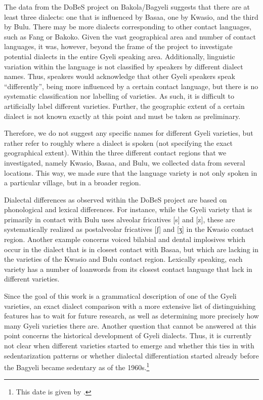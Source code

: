 The data from the DoBeS project on Bakola/Bagyeli suggests that there are at least three dialects: one that is influenced by Basaa, one by Kwasio, and the third by Bulu. There may be more dialects corresponding to other contact languages, such as Fang or Bakoko. Given the vast geographical area and number of contact languages, it was, however, beyond the frame of the project to investigate potential dialects in the entire Gyeli speaking area. Additionally, linguistic variation within the language is not classified by speakers by different dialect names. Thus, speakers would acknowledge that other Gyeli speakers speak ``differently'', being more influenced by a certain contact language, but there is no systematic classification nor labelling of varieties. 
As such, it is difficult to artificially label different varieties. Further, the geographic extent of a certain dialect is not  known exactly at this point and must be taken as preliminary.

Therefore, we do not suggest any specific names for different Gyeli varieties, but rather refer to roughly where a dialect is  spoken (not specifying the exact geographical extent). Within the three different contact regions that we investigated, namely Kwasio, Basaa, and Bulu, we collected data from several locations. This way, we made sure that the language variety is not only spoken in a particular village, but in a broader region.

Dialectal differences as observed within the DoBeS project are based on phonological and lexical differences. For instance, while the Gyeli variety that is primarily in contact with Bulu uses alveolar fricatives [s] and [z], these are systematically realized as postalveolar fricatives [ʃ] and [ʒ] in the Kwasio contact region. Another example concerns voiced bilabial and dental implosives which occur in the dialect that is in closest contact with Basaa, but which are lacking in the varieties of the Kwasio and Bulu contact region. Lexically speaking, each variety has a number of loanwords from its closest contact language that lack in different varieties.

Since the goal of this work is a grammatical description of one of the Gyeli varieties, an
exact dialect comparison with a more extensive list of distinguishing features has to wait for future research, as well as determining more precisely how many Gyeli varieties there are. Another question that cannot be answered at this point concerns the historical development of Gyeli dialects. Thus, it is currently not clear when different varieties started to emerge and whether this ties in with sedentarization patterns or whether dialectal differentiation started already before the Bagyeli became sedentary as of the 1960s.\footnote{This date is given by \citet[25]{renaud76}.}



